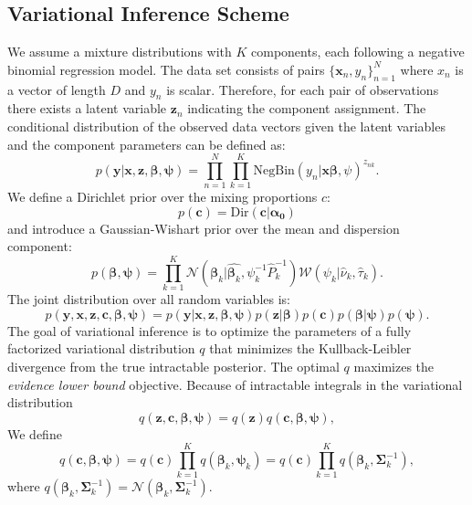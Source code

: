 \documentclass[a4paper,UKenglish]{oasics}
\begin{document}
\subsection{Variational Inference Scheme}
We assume a mixture distributions with $K$ components, each following a negative binomial regression model.
The data set consists of pairs $\lbrace \mathbf{x}_n, y_n \rbrace^N_{n=1}$ where $x_n$ is a vector of length $D$ and $y_n$ is scalar. Therefore, for each pair of observations %
there exists a latent variable $\mathbf{z}_n$ indicating the component assignment. The conditional distribution of the observed data vectors given the latent variables and the component parameters can be defined as:
$$
p(\mathbf{y}|\mathbf{x},\mathbf{z},\boldsymbol{\beta},\boldsymbol{\psi}) = \prod_{n=1}^N \prod_{k=1}^{K} \text{NegBin}(y_n|\boldsymbol{x}\boldsymbol{\beta},\psi)^{z_{nk}}.%
$$
We define a Dirichlet prior over the mixing proportions $c$:
$$
p(\mathbf{c}) = \text{Dir}(\mathbf{c}|\boldsymbol{\alpha_0})
$$
and introduce a Gaussian-Wishart prior over the mean and dispersion component:
$$
p(\boldsymbol{\beta}, \boldsymbol{\psi})=\prod_{k=1}^{K}\mathcal{N}(\boldsymbol{\beta}_k|\hat{\boldsymbol{\beta}_k},\psi_k^{-1} \hat P_k^{-1}) \mathcal{W}(\psi_k|\hat \nu_k, \hat \tau_k).
$$
The joint distribution over all random variables is:
$$
p(\mathbf{y},\mathbf{x},\mathbf{z},\boldsymbol{c},\boldsymbol{\beta},\boldsymbol{\psi})=p(\mathbf{y}|\mathbf{x}, \mathbf{z},\boldsymbol \beta,\boldsymbol \psi)p(\boldsymbol{z}|\boldsymbol \beta)p(\boldsymbol{c})p(\boldsymbol{\beta}|\boldsymbol \psi)p(\boldsymbol \psi).
$$
The goal of variational inference is to optimize the parameters of a fully factorized variational distribution $q$ that minimizes the Kullback-Leibler divergence from the true intractable posterior.
The optimal $q$ maximizes the \emph{evidence lower bound} objective. Because of intractable integrals in the variational distribution
$$
q(\mathbf{z},\mathbf{c},\boldsymbol{\beta},\boldsymbol{\psi})=q(\mathbf{z})q(\mathbf{c},\boldsymbol{\beta},\boldsymbol{\psi}),
$$ We define
$$
q(\mathbf{c},\boldsymbol{\beta},\boldsymbol{\psi})= q(\mathbf{c})\prod_{k=1}^{K}q(\boldsymbol{\beta}_k,\boldsymbol{\psi}_k)= q(\mathbf{c})\prod_{k=1}^{K}q(\boldsymbol{\beta}_k,\boldsymbol\Sigma^{-1}_k),
$$
where $q(\boldsymbol{\beta}_k,\boldsymbol\Sigma^{-1}_k)=\mathcal{N}(\boldsymbol{\beta}_k,\boldsymbol\Sigma^{-1}_k).
$
\end{document}
